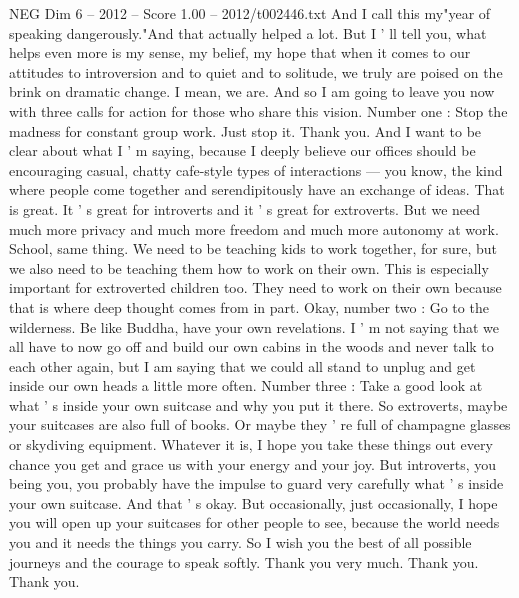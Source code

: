 \begin{textsample}{NEG Dim 6 – 2012 – Score 1.00 – 2012/t002446.txt}
And I call this my"year of speaking dangerously."And that actually helped a lot.
But I ' ll tell you, what helps even more is my sense, my belief, my hope that when it comes to our attitudes to introversion and to quiet and to solitude, we truly are poised on the brink on dramatic change.
I mean, we are.
And so I am going to leave you now with three calls for action for those who share this vision.
Number one : Stop the madness for constant group work.
Just stop it.
Thank you.
And I want to be clear about what I ' m saying, because I deeply believe our offices should be encouraging casual, chatty cafe-style types of interactions — you know, the kind where people come together and serendipitously have an exchange of ideas.
That is great.
It ' s great for introverts and it ' s great for extroverts.
But we need much more privacy and much more freedom and much more autonomy at work.
School, same thing.
We need to be teaching kids to work together, for sure, but we also need to be teaching them how to work on their own.
This is especially important for extroverted children too.
They need to work on their own because that is where deep thought comes from in part.
Okay, number two : Go to the wilderness.
Be like Buddha, have your own revelations.
I ' m not saying that we all have to now go off and build our own cabins in the woods and never talk to each other again, but I am saying that we could all stand to unplug and get inside our own heads a little more often.
Number three : Take a good look at what ' s inside your own suitcase and why you put it there.
So extroverts, maybe your suitcases are also full of books.
Or maybe they ' re full of champagne glasses or skydiving equipment.
Whatever it is, I hope you take these things out every chance you get and grace us with your energy and your joy.
But introverts, you being you, you probably have the impulse to guard very carefully what ' s inside your own suitcase.
And that ' s okay.
But occasionally, just occasionally, I hope you will open up your suitcases for other people to see, because the world needs you and it needs the things you carry.
So I wish you the best of all possible journeys and the courage to speak softly.
Thank you very much.
Thank you.
Thank you.

\end{textsample}
